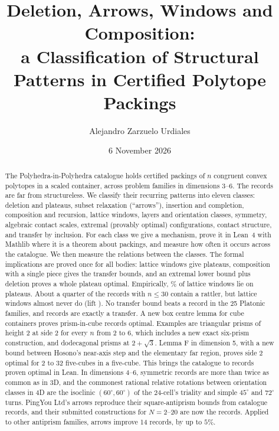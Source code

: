 \documentclass[11pt,a4paper]{article}
\title{Deletion, Arrows, Windows and Composition:\\a Classification of Structural Patterns in \nRecords{} Certified Polytope Packings}
\author{Alejandro Zarzuelo Urdiales}
\date{6 November 2026}
\theoremstyle{definition}
\theoremstyle{remark}
\begin{document}
\maketitle

\begin{abstract}
The Polyhedra-in-Polyhedra catalogue holds \nRecords{} certified packings of $n$ congruent convex polytopes in a scaled container, across \nFamilies{} problem families in dimensions 3--6. The records are far from structureless. We classify their recurring patterns into eleven classes: deletion and plateaus, subset relaxation (``arrows''), insertion and completion, composition and recursion, lattice windows, layers and orientation classes, symmetry, algebraic contact scales, extremal (provably optimal) configurations, contact structure, and transfer by inclusion. For each class we give a mechanism, prove it in Lean~4 with Mathlib where it is a theorem about packings, and measure how often it occurs across the catalogue. We then measure the relations between the classes. The formal implications are proved once for all bodies: lattice windows give plateaus, composition with a single piece gives the transfer bounds, and an extremal lower bound plus deletion proves a whole plateau optimal. Empirically, \pWinPla{}\% of lattice windows lie on plateaus. About a quarter of the records with $n\le30$ contain a rattler, but lattice windows almost never do (lift \liftRatWin{}). No transfer bound beats a record in the 25 Platonic families, and \nTrMatch{} records are exactly a transfer. A new box centre lemma for cube containers proves \nPrism{} prism-in-cube records optimal. Examples are triangular prisms of height 2 at side 2 for every $n$ from 2 to 6, which includes a new exact six-prism construction, and dodecagonal prisms at $2+\sqrt3$. Lemma F in dimension 5, with a new bound between Hosono's near-axis step and the elementary far region, proves side 2 optimal for 2 to 32 five-cubes in a five-cube. This brings the catalogue to \nProven{} records proven optimal in Lean. In dimensions 4--6, symmetric records are more than twice as common as in 3D, and the commonest rational relative rotations between orientation classes in 4D are the isoclinic $(60^\circ,60^\circ)$ of the 24-cell's triality and simple $45^\circ$ and $72^\circ$ turns. PingYou Ltd's arrows reproduce their square-antiprism bounds from catalogue records, and their submitted constructions for $N=2$--20 are now the records. Applied to other antiprism families, arrows improve 14 records, by up to $5\%$.
\end{abstract}
\end{document}
